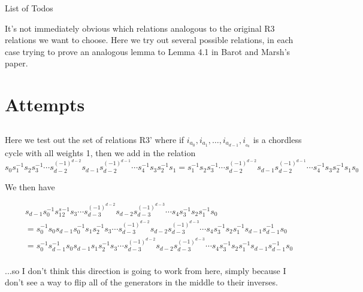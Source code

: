 \documentclass[11pt]{amsart}
\makeatletter
\theoremstyle{definition}
\def\listtodoname{List of Todos}
\def\listoftodos{\@starttoc{tdo}\listtodoname}
\makeatother
\begin{document}
\listoftodos
\newpage

It's not immediately obvious which relations analogous to the original R3 relations we want to choose.  Here we try out several possible relations, in each case trying to prove an analogous lemma to Lemma 4.1 in Barot and Marsh's paper.



\section{Attempts}

\subsection{}
Here we test out the set of relations R3' where if $i_{a_0}, i_{a_1},\ldots,i_{a_{d-1}},i__{a_0}$ is a chordless cycle with all weights 1, then we add in the relation 
$$s_0s_1^{-1}s_2s_3^{-1}\cdots s_{d-2}^{(-1)^{d-2}} s_{d-1}s_{d-2}^{(-1)^{d-1}}\cdots s_4^{-1}s_3s_2^{-1}s_1 = s_1^{-1}s_2s_3^{-1}\cdots s_{d-2}^{(-1)^{d-2}} s_{d-1}s_{d-2}^{(-1)^{d-1}}\cdots s_4^{-1}s_3s_2^{-1}s_1s_0$$


We then have

\begin{align*}
& s_{d-1}s_0^{-1}s_1^s_2^{-1}s_3\cdots s_{d-3}^{(-1)^{d-2}} s_{d-2}s_{d-3}^{(-1)^{d-3}}\cdots s_4s_3^{-1}s_2s_1^{-1}s_0\\
&= s_0^{-1}s_0s_{d-1}s_0^{-1}s_1s_2^{-1}s_3\cdots s_{d-3}^{(-1)^{d-2}} s_{d-2}s_{d-3}^{(-1)^{d-3}}\cdots s_4s_3^{-1}s_2s_1^{-1}s_{d-1}s_{d-1}^{-1}s_0\\
&= s_0^{-1}s_{d-1}^{-1}s_0s_{d-1}s_1s_2^{-1}s_3\cdots s_{d-3}^{(-1)^{d-2}} s_{d-2}s_{d-3}^{(-1)^{d-3}}\cdots s_4s_3^{-1}s_2s_1^{-1}s_{d-1}s_{d-1}^{-1}s_0\\
\end{align*}


...so I don't think this direction is going to work from here, simply because I don't see a way to flip all of the generators in the middle to their inverses.
\end{document}
